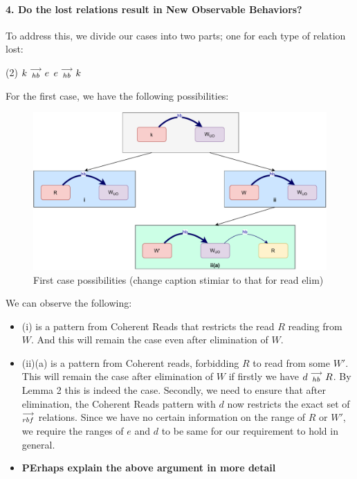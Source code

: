 \paragraph{4. Do the lost relations result in New Observable Behaviors?}

    To address this, we divide our cases into two parts; one for each type of relation lost:
    \begin{tasks}(2)
        \task $k\stackrel{\longrightarrow}{_{hb}}e$
        \task $e\stackrel{\longrightarrow}{_{hb}}k$
    \end{tasks}

    For the first case, we have the following possibilities:
    \begin{figure}[H]
        \centering
        \includegraphics[scale=0.5]{Elimination/WriteElimProof/ProofParts/Part4Case1.pdf}
        \caption{First case possibilities (change caption stimiar to that for read elim)}
    \end{figure}

    We can observe the following:
    \begin{itemize}
        \item (i) is a pattern from Coherent Reads that restricts the read $R$ reading from $W$. And this will remain the case even after elimination of $W$.
        \item (ii)(a) is a pattern from Coherent reads, forbidding $R$ to read from some $W'$. This will remain the case after elimination of $W$ if firstly we have $d\stackrel{\longrightarrow}{_{hb}}R$. By Lemma 2 this is indeed the case. Secondly, we need to ensure that after elimination, the Coherent Reads pattern with $d$ now restricts the exact set of $\stackrel{\longrightarrow}{_{rbf}}$  relations. Since we have no certain information on the range of $R$ or $W'$, we require the ranges of $e$ and $d$ to be same for our requirement to hold in general. 
        \item \textbf{PErhaps explain the above argument in more detail}
    \end{itemize}


